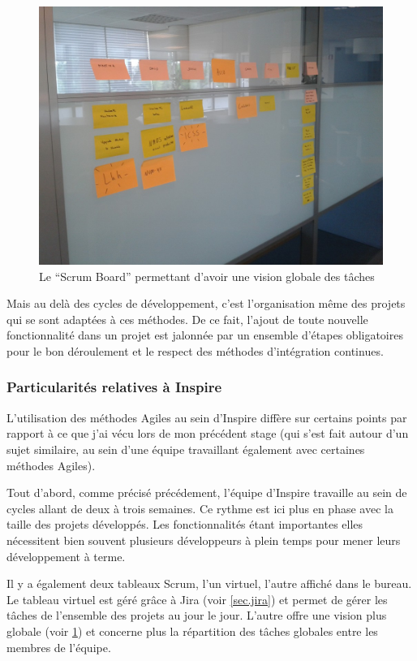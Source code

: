 \documentclass[12pt,a4paper]{book}
\begin{document}
\begin{figure}[htp]
\centering
\includegraphics[scale=.40]{img/agile1.jpg}
 \caption{Le ``Scrum Board'' permettant d'avoir une vision globale des tâches}
 \label{fig.agile1}
\end{figure}

Mais au delà des cycles de développement, c'est l'organisation même des projets qui se sont adaptées à ces méthodes. De ce fait, l'ajout de toute nouvelle fonctionnalité dans un projet est jalonnée par un ensemble d'étapes obligatoires pour le bon déroulement et le respect des méthodes d'intégration continues.

\subsubsection{Particularités relatives à Inspire}

L'utilisation des méthodes Agiles au sein d'Inspire diffère sur certains points par rapport à ce que j'ai vécu lors de mon précédent stage (qui s'est fait autour d'un sujet similaire, au sein d'une équipe travaillant également avec certaines méthodes Agiles).

Tout d'abord, comme précisé précédement, l'équipe d'Inspire travaille au sein de cycles allant de deux à trois semaines. Ce rythme est ici plus en phase avec la taille des projets développés. Les fonctionnalités étant importantes elles nécessitent bien souvent plusieurs développeurs à plein temps pour mener leurs développement à terme. 

Il y a également deux tableaux Scrum, l'un virtuel, l'autre affiché dans le bureau. Le tableau virtuel est géré grâce à Jira (voir \cref{sec.jira}) et permet de gérer les tâches de l'ensemble des projets au jour le jour. L'autre offre une vision plus globale (voir \cref{fig.agile1}) et concerne plus la répartition des tâches globales entre les membres de l'équipe.
\end{document}
